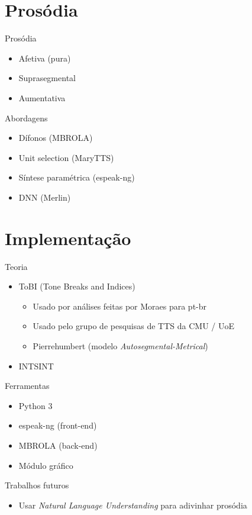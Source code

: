 \documentclass{beamer}
\begin{document}
\section{Prosódia}
\begin{frame}{Prosódia}
  \begin{itemize}
    \item Afetiva (pura)
    \item Suprasegmental
    \item Aumentativa
  \end{itemize}
\end{frame}

\begin{frame}{Abordagens}
  \begin{itemize}
    \item Dífonos (MBROLA)
    \item Unit selection (MaryTTS)
    \item Síntese paramétrica (espeak-ng)
    \item DNN (Merlin)
  \end{itemize}
\end{frame}

\section{Implementação}
\begin{frame}{Teoria}
  \begin{itemize}
  \item ToBI (Tone Breaks and Indices)
    \begin{itemize}
    \item Usado por análises feitas por Moraes para pt-br
    \item Usado pelo grupo de pesquisas de TTS da CMU / UoE
    \item Pierrehumbert (modelo \emph{Autosegmental-Metrical})
    \end{itemize}
  \item INTSINT
  \end{itemize}
\end{frame}

\begin{frame}{Ferramentas}
  \begin{itemize}
    \item Python 3
    \item espeak-ng (front-end)
    \item MBROLA (back-end)
    \item Módulo gráfico
  \end{itemize}
\end{frame}

\begin{frame}{Trabalhos futuros}
  \begin{itemize}
    \item Usar \emph{Natural Language Understanding} para adivinhar prosódia
  \end{itemize}
\end{frame}
\end{document}
